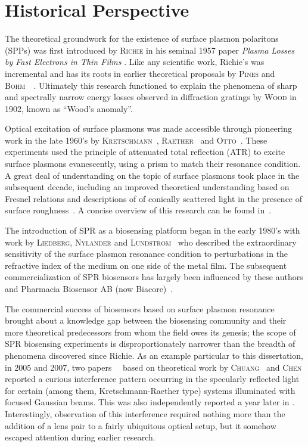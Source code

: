 \documentclass[a4paper,titlepage,onecolumn]{report}
\begin{document}
\section{Historical Perspective}
The theoretical groundwork for the existence of surface plasmon polaritons
(SPPs) was first introduced by \textsc{Richie} in his seminal 1957 paper
\textit{Plasma Losses by Fast Electrons in Thin Films}
\cite{ritchie1957plasma}.  Like any scientific work, Richie's was
incremental and has its roots in earlier theoretical proposals by
\textsc{Pines} and
\textsc{Bohm}~\cite{bohm1951collective}~\cite{pines1952collective}.
Ultimately this research functioned to explain the phenomena of sharp and
spectrally narrow energy losses observed in diffraction gratings by
\textsc{Wood} in 1902, known as ``Wood's anomaly''.

Optical excitation of surface plasmons was made accessible through
pioneering work in the late 1960's by
\textsc{Kretschmann}~\cite{kretschmann1968},
\textsc{Raether}~\cite{raether1965springer} and
\textsc{Otto}~\cite{otto1968excitation}.  These experiments used the
principle of attenuated total reflection (ATR) to excite surface plasmons
evanescently, using a prism to match their resonance condition.  A great
deal of understanding on the topic of surface plasmons took place in the
subsequent decade, including an improved theoretical understanding based on
Fresnel relations \cite{chen1976excitation} and descriptions of of
conically scattered light in the presence of surface
roughness~\cite{simon1976directional}.  A concise overview of this research
can be found in~\cite{raether1997surface}.

The introduction of SPR as a biosensing platform began in the early 1980's
with work by \textsc{Liedberg}, \textsc{Nylander} and
\textsc{Lundstrom}~\cite{liedberg1983surface} who described the
extraordinary sensitivity of the surface plasmon resonance condition to
perturbations in the refractive index of the medium on one side of the
metal film.  The subsequent commercialization of SPR biosensors has largely
been influenced by these authors and Pharmacia Biosensor AB (now
Biacore)~\cite{liedberg1995biosensing}.

The commercial success of biosensors based on surface plasmon resonance
brought about a knowledge gap between the biosensing community and their
more theoretical predecessors from whom the field owes its genesis; the
scope of SPR biosensing experiments is disproportionately narrower than the
breadth of phenomena discovered since Richie.  As an example particular to
this dissertation, in 2005 and 2007, two
papers~\cite{andaloro2005optical}~\cite{simon2007observation} based on
theoretical work by \textsc{Chuang}~\cite{chuang1986lateral} and
\textsc{Chen} \cite{chen1976excitation} reported a curious interference
pattern occurring in the specularly reflected light for certain (among
them, Kretschmann-Raether type) systems illuminated with focused Gaussian
beams.  This was also independently reported a year later in
\cite{schumann2008near}.  Interestingly, observation of this interference
required nothing more than the addition of a lens pair to a fairly
ubiquitous optical setup, but it somehow escaped attention during earlier
research.  
\end{document}
